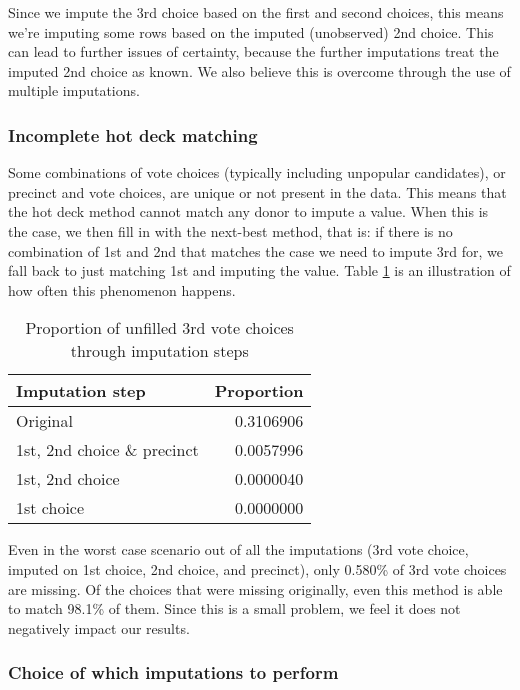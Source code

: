 \documentclass[12pt,twoside]{reedthesis}
\begin{document}
Since we impute the 3rd choice based on the first and second choices, this means we're imputing some rows based on the imputed (unobserved) 2nd choice. This can lead to further issues of certainty, because the further imputations treat the imputed 2nd choice as known. We also believe this is overcome through the use of multiple imputations.

\hypertarget{incomplete-hot-deck-matching}{%
\subsubsection{Incomplete hot deck matching}\label{incomplete-hot-deck-matching}}

Some combinations of vote choices (typically including unpopular candidates), or precinct and vote choices, are unique or not present in the data. This means that the hot deck method cannot match any donor to impute a value. When this is the case, we then fill in with the next-best method, that is: if there is no combination of 1st and 2nd that matches the case we need to impute 3rd for, we fall back to just matching 1st and imputing the value. Table \ref{tab:no-rhd-match} is an illustration of how often this phenomenon happens.
\begin{longtable}{lr}
\caption[Imputation mismatches - 3rd choice]{\label{tab:no-rhd-match}Proportion of unfilled 3rd vote choices through imputation steps}\\
\toprule
Imputation step & Proportion\\
\midrule
Original & 0.3106906\\
1st, 2nd choice \& precinct & 0.0057996\\
1st, 2nd choice & 0.0000040\\
1st choice & 0.0000000\\
\bottomrule
\end{longtable}
Even in the worst case scenario out of all the imputations (3rd vote choice, imputed on 1st choice, 2nd choice, and precinct), only 0.580\% of 3rd vote choices are missing. Of the choices that were missing originally, even this method is able to match 98.1\% of them. Since this is a small problem, we feel it does not negatively impact our results.

\hypertarget{choice-of-which-imputations-to-perform}{%
\subsubsection{Choice of which imputations to perform}\label{choice-of-which-imputations-to-perform}}
\end{document}

